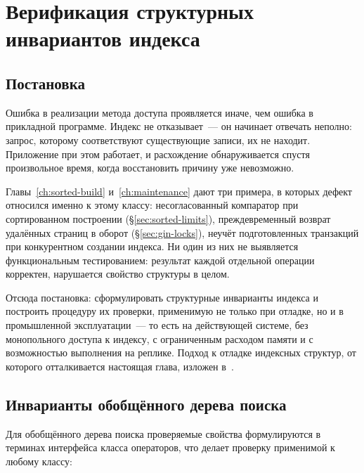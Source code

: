 \chapter{Верификация структурных инвариантов индекса}
\label{ch:verification}

\section{Постановка}

Ошибка в реализации метода доступа проявляется иначе, чем ошибка в прикладной
программе. Индекс не отказывает~--- он начинает отвечать неполно: запрос,
которому соответствуют существующие записи, их не находит. Приложение при этом
работает, и расхождение обнаруживается спустя произвольное время, когда
восстановить причину уже невозможно.

Главы~\ref{ch:sorted-build} и~\ref{ch:maintenance} дают три примера, в которых
дефект относился именно к этому классу: несогласованный компаратор при
сортированном построении (§\ref{sec:sorted-limits}), преждевременный возврат
удалённых страниц в оборот (§\ref{sec:gin-locks}), неучёт подготовленных
транзакций при конкурентном создании индекса. Ни один из них не выявляется
функциональным тестированием: результат каждой отдельной операции корректен,
нарушается свойство структуры в целом.

Отсюда постановка: сформулировать структурные инварианты индекса и построить
процедуру их проверки, применимую не только при отладке, но и в промышленной
эксплуатации~--- то есть на действующей системе, без монопольного доступа к
индексу, с ограниченным расходом памяти и с возможностью выполнения на реплике.
Подход к отладке индексных структур, от которого отталкивается настоящая глава,
изложен в~\cite{borodin2016debug}.

\section{Инварианты обобщённого дерева поиска}

Для обобщённого дерева поиска проверяемые свойства формулируются в терминах
интерфейса класса операторов, что делает проверку применимой к любому классу:

